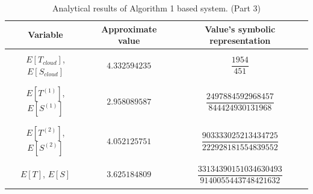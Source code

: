 \documentclass[10pt,a4paper]{article}
\begin{document}
\begin{table}[h!]
\caption{Analytical results of Algorithm 1 based system. (Part 3)}
\begin{adjustbox}{center=\textwidth}
	
     \begin{tabular}{c|c|c}
     \toprule
     \textbf{Variable} & \textbf{Approximate value} & \textbf{Value's symbolic representation} \\
     \toprule
	 &&\\
	 
	 $E[T_{cloud}]$, $E[S_{cloud}]$ & $4.332594235$ & $\dfrac{1954}{451}$  \\
	 
	 &&\\\hline &&\\
     
     $E[T^{(1)}]$, $E[S^{(1)}]$ & $2.958089587$ & $\dfrac{2497884592968457}{844424930131968}$  \\
     
     &&\\\hline &&\\
     
     $E[T^{(2)}]$, $E[S^{(2)}]$ & $4.052125751$ & $\dfrac{903333025213434725}{222928181554839552}$  \\
     
     &&\\\hline &&\\
     
     $E[T]$, $E[S]$ & $3.625184809$ & $\dfrac{33134390151034630493}{9140055443748421632}$  \\
	
	 &&\\

     \bottomrule

    \end{tabular}
    \end{adjustbox}
\end{table}

\end{document}

